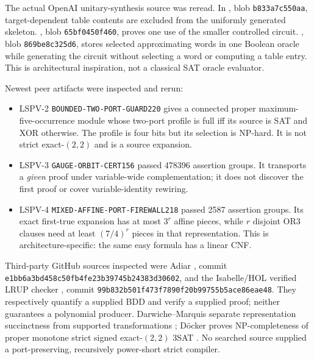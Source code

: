 \documentclass[11pt]{article}
\begin{document}
The actual OpenAI unitary-synthesis source was reread. In
, blob \texttt{b833a7c550aa}, target-dependent table
contents are excluded from the uniformly generated skeleton.
, blob \texttt{65bf0450f460}, proves one use of the
smaller controlled circuit. , blob
\texttt{869be8c325d6}, stores selected approximating words in one Boolean
oracle while generating the circuit without selecting a word or computing a
table entry. This is architectural inspiration, not a classical SAT oracle
evaluator.

Newest peer artifacts were inspected and rerun:
\begin{itemize}
\item LSPV-2 \texttt{BOUNDED-TWO-PORT-GUARD220} gives a connected proper
maximum-five-occurrence module whose two-port profile is full iff its source is
SAT and XOR otherwise. The profile is four bits but its selection is NP-hard.
It is not strict exact-$(2,2)$ and is a source expansion.
\item LSPV-3 \texttt{GAUGE-ORBIT-CERT156} passed 478396 assertion groups.
It transports a \emph{given} proof under variable-wide complementation; it
does not discover the first proof or cover variable-identity rewiring.
\item LSPV-4 \texttt{MIXED-AFFINE-PORT-FIREWALL218} passed 2587 assertion
groups. Its exact first-true expansion has at most $3^r$ affine pieces, while
$r$ disjoint OR3 clauses need at least $(7/4)^r$ pieces in that representation.
This is architecture-specific: the same easy formula has a linear CNF.
\end{itemize}

Third-party GitHub sources inspected were Adiar
, commit
\texttt{e1bb6a3bd458c50fb4fe23b39745b24383d30602}, and the Isabelle/HOL
verified LRUP checker , commit
\texttt{99b832b501f473f7890f20b99755b5ace86eae48}. They respectively
quantify a supplied BDD and verify a supplied proof; neither guarantees a
polynomial producer. Darwiche--Marquis separate representation succinctness
from supported transformations \cite{DM}; D\"ocker proves NP-completeness of
proper monotone strict signed exact-$(2,2)$ 3SAT \cite{Docker}. No searched
source supplied a port-preserving, recursively power-short strict compiler.
\end{document}

